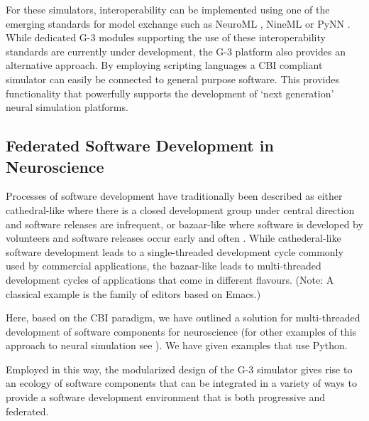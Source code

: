 \documentclass[10pt]{article}
\begin{document}
For these simulators, interoperability can be implemented using
one of the emerging standards for model exchange such as
NeuroML \cite{nigel01:_towar_neurom},
NineML \cite{gortechnikov10:_ninem_user_layer} or
PyNN \cite{davison08:_pynn}.  While dedicated G-3 modules supporting
the use of these interoperability standards are currently under
development, the G-3 platform also provides an alternative
approach. By employing scripting languages a CBI 
compliant simulator can easily be connected to general purpose software. 
This provides functionality that powerfully supports the development of 
`next generation' neural simulation platforms.

\subsection*{Federated Software Development in Neuroscience}

Processes of software development have traditionally been described as
either cathedral-like where there is a closed development group under
central direction and software releases are infrequent, or
bazaar-like where software is developed by
volunteers and software releases occur early and
often \cite{raymond01:_cathed_bazaar, citeulike:126678}.
While cathederal-like software development leads to a single-threaded
development cycle commonly used by commercial applications, the
bazaar-like leads to multi-threaded development cycles of
applications that come in different flavours. (Note: A classical
  example is the family of editors based on Emacs.)

Here, based on the CBI paradigm, we have outlined a solution for
multi-threaded development of software components for neuroscience
(for other examples of this approach to neural simulation
see \cite{schuermann09:_neuron, nordlie09:_visual}).  We have given
examples that use Python.

Employed in this way, the modularized design of the G-3 simulator
gives rise to an ecology of software components that can be integrated
in a variety of ways to provide a software development environment
that is both progressive and federated.
\end{document}
